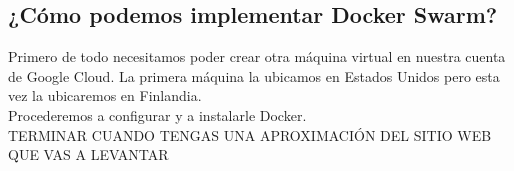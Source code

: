 \subsection{¿Cómo podemos implementar Docker Swarm?}
Primero de todo necesitamos poder crear otra máquina virtual en nuestra cuenta de Google Cloud. La primera máquina la ubicamos en Estados Unidos pero esta vez la ubicaremos en Finlandia.
\\Procederemos a configurar y a instalarle Docker.
\\TERMINAR CUANDO TENGAS UNA APROXIMACIÓN DEL SITIO WEB QUE VAS A LEVANTAR